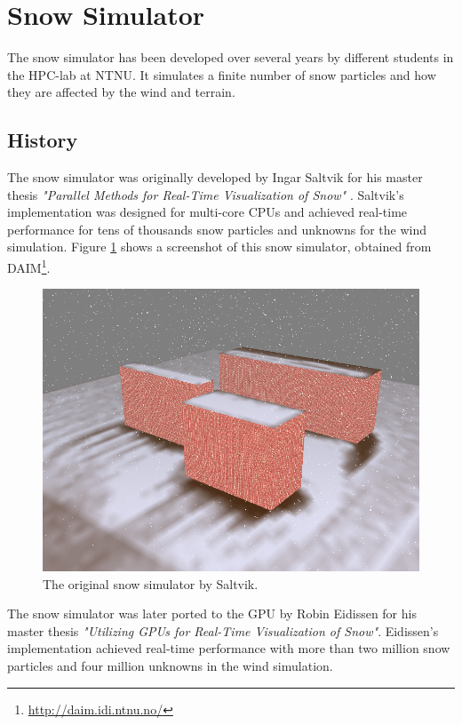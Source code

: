 \section{Snow Simulator}

The snow simulator has been developed over several years by different students in 
the HPC-lab at NTNU. It simulates a finite number of snow particles and how they 
are affected by the wind and terrain. 

\subsection{History}

The snow simulator was originally developed  by Ingar Saltvik for his master
thesis \emph{"Parallel Methods for Real-Time  Visualization of Snow"}
\cite{originalSnowThesis}. Saltvik's implementation was  designed for multi-core
CPUs and achieved real-time performance for tens of  thousands snow particles
and unknowns for the wind simulation. Figure \ref{fig:originalSnow} shows a 
screenshot of this snow simulator, obtained from DAIM\footnote{\url{http://daim.idi.ntnu.no/}}.

\begin{figure}[ht]
	\center
	\includegraphics[width=1.0\textwidth]{images/snow/serial/snow5}
	\caption{The original snow simulator by Saltvik.}
	\label{fig:originalSnow}
\end{figure}

The snow simulator was later ported to the GPU by Robin Eidissen for his master 
thesis \emph{"Utilizing GPUs for Real-Time Visualization of Snow"}\cite{gpuSnowThesis}.
Eidissen's implementation achieved real-time performance with more than two million 
snow particles and four million unknowns in the wind simulation. 

